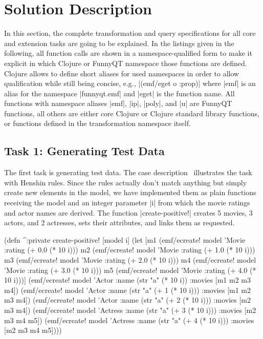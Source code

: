 \documentclass[submission]{eptcs}
\newcommand{\code}{\clojureinline}
\begin{document}
\section{Solution Description}
\label{sec:solution-description}

In this section, the complete transformation and query specifications for all
core and extension tasks are going to be explained.  In the listings given in
the following, all function calls are shown in a namespace-qualified form to
make it explicit in which Clojure or FunnyQT namespace those functions are
defined.  Clojure allows to define short aliases for used namespaces in order
to allow qualification while still being concise, e.g., \code|(emf/eget o
:prop)| where \code|emf| is an alias for the namespace \code|funnyqt.emf| and
\code|eget| is the function name.  All functions with namespace aliases
\code|emf|, \code|ip|, \code|poly|, and \code|u| are FunnyQT functions, all
others are either core Clojure or Clojure standard library functions, or
functions defined in the transformation namespace itself.


\subsection{Task 1: Generating Test Data}
\label{sec:task-1:generating-test-data}

The first task is generating test data.  The case
description~\cite{movies-case-desc} illustrates the task with Henshin rules.
Since the rules actually don't match anything but simply create new elements in
the model, we have implemented them as plain functions receiving the model and
an integer parameter \code|i| from which the movie ratings and actor names are
derived.  The function \code|create-positive!| creates 5 movies, 3 actors, and
2 actresses, sets their attributes, and links them as requested.

\begin{clojurecode}
(defn ^:private create-positive! [model i]
  (let [m1 (emf/ecreate! model 'Movie {:rating (+ 0.0 (* 10 i))})
        m2 (emf/ecreate! model 'Movie {:rating (+ 1.0 (* 10 i))})
        m3 (emf/ecreate! model 'Movie {:rating (+ 2.0 (* 10 i))})
        m4 (emf/ecreate! model 'Movie {:rating (+ 3.0 (* 10 i))})
        m5 (emf/ecreate! model 'Movie {:rating (+ 4.0 (* 10 i))})]
    (emf/ecreate! model 'Actor   {:name (str "a" (* 10 i))       :movies [m1 m2 m3 m4]})
    (emf/ecreate! model 'Actor   {:name (str "a" (+ 1 (* 10 i))) :movies [m1 m2 m3 m4]})
    (emf/ecreate! model 'Actor   {:name (str "a" (+ 2 (* 10 i))) :movies [m2 m3 m4]})
    (emf/ecreate! model 'Actress {:name (str "a" (+ 3 (* 10 i))) :movies [m2 m3 m4 m5]})
    (emf/ecreate! model 'Actress {:name (str "a" (+ 4 (* 10 i))) :movies [m2 m3 m4 m5]})))
\end{clojurecode}
\end{document}
